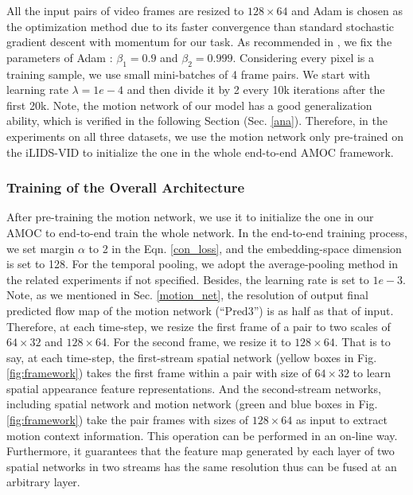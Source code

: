 \documentclass[journal]{IEEEtran}
\begin{document}
 All the input pairs of video frames are resized to $128 \times 64$ and Adam\cite{kingma2014adam} is chosen as the optimization method due to its faster convergence than standard stochastic gradient descent with momentum for our task. As recommended in \cite{kingma2014adam}, we fix the parameters of Adam : $ \beta_{1}= 0.9$ and $\beta_{2} = 0.999$. Considering every pixel is a training sample, we use small mini-batches of 4 frame pairs. We start with learning rate $\lambda= 1e-4$ and then divide it by 2 every 10k iterations after the first 20k. Note, the motion network of our model has a good generalization ability, which is verified in the following Section (Sec. \ref{ana}). Therefore, in the experiments on all three datasets, we use the motion network only pre-trained on the iLIDS-VID to initialize the one in the whole end-to-end AMOC framework.
 
\subsubsection{Training of the Overall Architecture}
After pre-training the motion network, we use it to initialize the one in our AMOC to end-to-end train the whole network. In the end-to-end training process, we set margin $\alpha$ to 2  in the Eqn. \eqref{con_loss}, and the embedding-space dimension is set to 128. For the temporal pooling, we adopt the average-pooling method in the related experiments if not specified. Besides, the learning rate is set to $1e-3$. Note, as we mentioned in  Sec. \ref{motion_net}, the resolution of output final predicted flow map of the motion network (``Pred3'')  is as half as that of input. Therefore, at each time-step, we resize the first frame of a pair to two scales of $64 \times 32$ and $128 \times 64$. For the second frame, we resize it to $128 \times 64$. That is to say, at each time-step, the first-stream spatial network (yellow boxes in Fig.\ref{fig:framework}) takes the first frame within a pair with size of $64 \times 32$ to learn spatial appearance feature representations. And the second-stream networks, including spatial network and motion network (green and blue boxes in Fig.\ref{fig:framework}) take the pair frames with sizes of $128 \times 64$ as input to extract motion context information. This operation can be performed in an on-line way. Furthermore, it guarantees that the feature map generated by each layer of two spatial networks in two streams has the same resolution thus can be fused at an arbitrary layer. 
\end{document}
